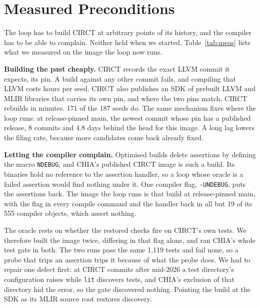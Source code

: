 \documentclass[conference]{IEEEtran}
\begin{document}
\section{Measured Preconditions}\label{sec:pre}
The loop has to build CIRCT at arbitrary points of its history, and the compiler
has to be able to complain. Neither held when we started. Table~\ref{tab:meas}
lists what we measured on the image the loop now runs.

\textbf{Building the past cheaply.} CIRCT records the exact LLVM commit it
expects, its pin. A build against any other commit fails, and compiling that
LLVM costs hours per seed. CIRCT also publishes an SDK of prebuilt LLVM and MLIR
libraries that carries its own pin, and where the two pins match, CIRCT rebuilds
in minutes. 171 of the 187 seeds do. The same mechanism fixes where the loop
runs: at release-pinned main, the newest commit whose pin has a published
release, 8 commits and 4.8 days behind the head for this image. %
A long lag lowers the filing rate, because more candidates come back already
fixed.

\textbf{Letting the compiler complain.} Optimised builds delete assertions by
defining the macro \texttt{NDEBUG}, and CHIA's published CIRCT image is such a
build. Its binaries hold no reference to the assertion handler, so a loop whose
oracle is a failed assertion would find nothing under it. One compiler flag,
\texttt{-UNDEBUG}, puts the assertions back. The image the loop runs is that
build at release-pinned main, with the flag in every compile command and the
handler back in all but 19 of its 555 compiler objects, which assert nothing. %

The oracle rests on whether the restored checks fire on CIRCT's own tests. We
therefore built the image twice, differing in that flag alone, and ran CHIA's
whole test gate in both. The two runs pass the same 1,119 tests and fail none, %
so a probe that trips an assertion trips it because of what the probe does. We
had to repair one defect first: at CIRCT commits after mid-2026 a test
directory's configuration raises while \texttt{lit} discovers tests, and CHIA's
exclusion of that directory hid the error, so the gate discovered nothing.
Pointing the build at the SDK as its MLIR source root restores discovery. %
\end{document}

